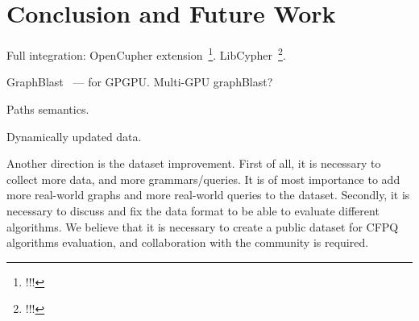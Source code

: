 \section{Conclusion and Future Work}

Full integration: OpenCupher extension~\footnote{!!!}.
LibCypher~\footnote{!!!}.

GraphBlast~\cite{yang2019graphblast} --- for GPGPU.
Multi-GPU graphBlast?

Paths semantics.

Dynamically updated data. 

Another direction is the dataset improvement.
First of all, it is necessary to collect more data, and more grammars/queries.
It is of most importance to add more real-world graphs and more real-world queries to the dataset.
Secondly, it is necessary to discuss and fix the data format to be able to evaluate different algorithms.
We believe that it is necessary to create a public dataset for CFPQ algorithms evaluation, and collaboration with the community is required.

